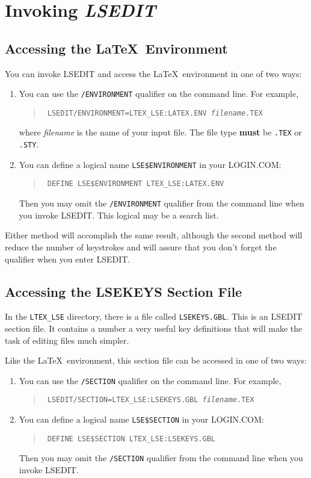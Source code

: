 \section{Invoking {\sl LSEDIT\/}}

\subsection{Accessing the \LaTeX\ Environment}

You can invoke LSEDIT and access the \LaTeX\ environment in one of two ways:

\begin{enumerate}
\item You can use the {\tt /ENVIRONMENT} qualifier on the command line. For
example,
\begin{quote}
\tt
\prompt{} LSEDIT/ENVIRONMENT=LTEX\_LSE:LATEX.ENV {\it filename\/}.TEX \hfil
\end{quote}
where {\it filename\/} is the name of your input file.  The file type {\bf
must} be {\tt .TEX} or {\tt .STY}.

\item You can define a logical name {\tt LSE\$ENVIRONMENT} in your LOGIN.COM:
\begin{quote}
\tt
\prompt{} DEFINE LSE\$ENVIRONMENT LTEX\_LSE:LATEX.ENV \hfil
\end{quote}
Then you may omit the {\tt /ENVIRONMENT} qualifier from the command line when
you invoke LSEDIT. This logical may be a search list.
\end{enumerate}

Either method will accomplish the same result, although the second method will
reduce the number of keystrokes and will assure that you don't forget the
qualifier when you enter LSEDIT.

\subsection{Accessing the LSEKEYS Section File}

In the \verb|LTEX_LSE| directory, there is a file called \verb|LSEKEYS.GBL|.
This is an LSEDIT section file. It contains a number a very useful key
definitions that will make the task of editing files much simpler.

Like the \LaTeX\ environment, this section file can be accessed in one of two
ways:
\begin{enumerate}
\item You can use the {\tt /SECTION} qualifier on the command line. For
example,
\begin{quote}
\tt
\prompt{} LSEDIT/SECTION=LTEX\_LSE:LSEKEYS.GBL {\it filename\/}.TEX \hfil
\end{quote}

\item You can define a logical name {\tt LSE\$SECTION} in your LOGIN.COM:
\begin{quote}
\tt
\prompt{} DEFINE LSE\$SECTION LTEX\_LSE:LSEKEYS.GBL \hfil
\end{quote}
Then you may omit the {\tt /SECTION} qualifier from the command line when
you invoke LSEDIT.
\end{enumerate}


